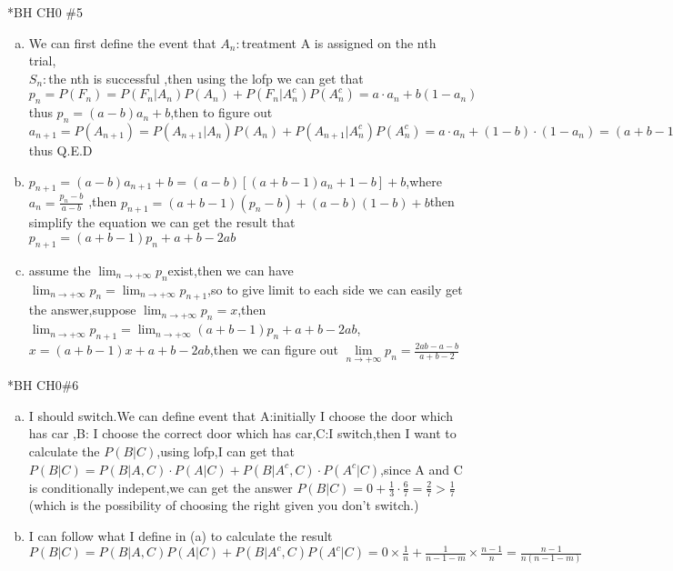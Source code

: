 \documentclass{article}
\begin{document}
\begin{homeworkProblem}*{BH CH0 \#5}

\begin{enumerate}[(a)]
	\item We can first define the event that $A_n:$treatment A is assigned on the nth trial,\\
	$S_n:$the nth is successful ,then using the lofp we can get that $p_n=P(F_n)=P(F_n|A_n)P(A_n)+P(F_n|A_n^c)P(A_n^c)=a\cdot a_n+b(1-a_n)$
	\\thus $p_n=(a-b)a_n+b$,then to figure out $a_{n+1}=P(A_{n+1})=P(A_{n+1}|A_{n})P(A_n)+P(A_{n+1}|A_{n}^c)P(A_{n}^c)=a\cdot a_n+(1-b)\cdot (1-a_n)=(a+b-1)a_n+1-b$
thus Q.E.D
	\item$p_{n+1}=(a-b)a_{n+1}+b=(a-b)[(a+b-1)a_n+1-b]+b$,where $a_n=\frac{p_n-b}{a-b}$ ,then $p_{n+1}=(a+b-1)(p_n-b)+(a-b)(1-b)+b$then simplify the equation we can get the result that $p_{n+1}=(a+b-1)p_n+a+b-2ab$
\item assume the $\lim_{n\to+\infty}p_n$exist,then we can have $\lim_{n\to+\infty}p_n=\lim_{n\to+\infty}p_{n+1}$,so to give limit to each side we can easily get the answer,suppose $\lim_{n\to+\infty}p_n=x$,then $\lim_{n\to+\infty}p_{n+1}=\lim_{n\to+\infty}(a+b-1)p_n+a+b-2ab$,$x=(a+b-1)x+a+b-2ab$,then we can figure out $\lim\limits_{n\to +\infty}p_n=\frac{2ab-a-b}{a+b-2}$
\end{enumerate}

\end{homeworkProblem}
\begin{homeworkProblem}*{BH CH0\#6}
	\large{
	\begin{enumerate}[(a)]
		\item I should switch.We can define event that A:initially I choose the door which has car ,B: I choose the correct door which has car,C:I switch,then I want to calculate the $P(B|C)$,using lofp,I can get that $P(B|C)=P(B|A,C)\cdot P(A|C)+P(B|A^c,C)\cdot P(A^c|C)$,since A and C is conditionally indepent,we can get the answer $P(B|C)=0+\frac{1}{3}\cdot\frac{6}{7}=\frac{2}{7}>\frac{1}{7}$(which is the possibility of choosing the right given you don't switch.)
		\item  I can follow what I define in (a) to calculate the result $P(B|C)=P(B|A,C)P(A|C)+P(B|A^c,C)P(A^c|C)=0\times \frac{1}{n}+\frac{1}{n-1-m}\times \frac{n-1}{n}=\frac{n-1}{n(n-1-m)}$
	\end{enumerate}
	}
\end{homeworkProblem}
\end{document}
